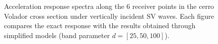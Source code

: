 \documentclass[11pt,letterpaper]{article}
\begin{document}
\begin{figure}[H]
	\center
	\caption{\small Acceleration response spectra along the 6 receiver points in the cerro Volador cross section under vertically incident SV waves. Each figure compares the exact response with the results obtained through simplified models (band parameter $d = [25 , 50 , 100]$).}
 \label{fig:SaptosVolEWSV}
\end{figure}
\end{document}
